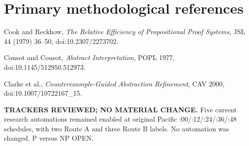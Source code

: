 \documentclass[11pt]{article}
\begin{document}
\section*{Primary methodological references}
\noindent Cook and Reckhow, \emph{The Relative Efficiency of Propositional Proof Systems}, JSL 44 (1979) 36--50, doi:10.2307/2273702.

\noindent Cousot and Cousot, \emph{Abstract Interpretation}, POPL 1977, doi:10.1145/512950.512973.

\noindent Clarke et al., \emph{Counterexample-Guided Abstraction Refinement}, CAV 2000, doi:10.1007/10722167\_15.

\medskip
\noindent\textbf{TRACKERS REVIEWED; NO MATERIAL CHANGE.} Five current research automations remained enabled at original Pacific :00/:12/:24/:36/:48 schedules, with two Route A and three Route B labels. No automation was changed. P versus NP OPEN.
\end{document}
